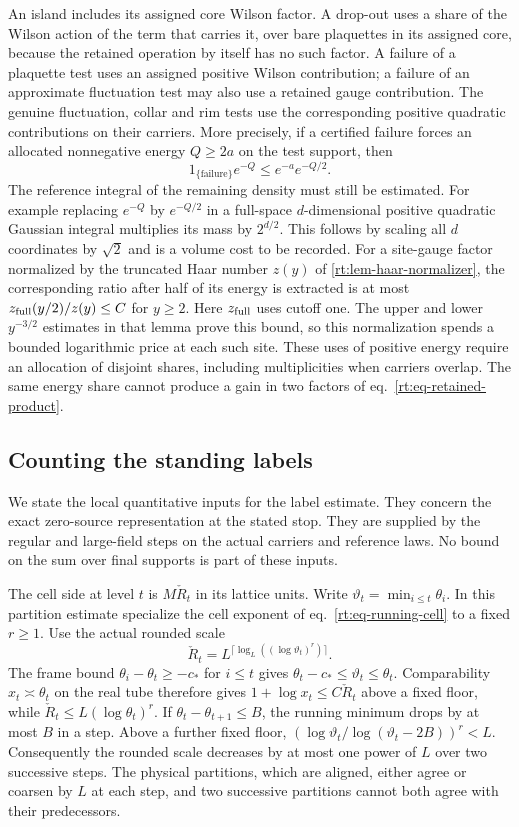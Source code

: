 \documentclass[11pt,letterpaper,reqno]{amsart}
\numberwithin{equation}{section}
\renewcommand{\eqref}[1]{\textup{eq.~\ref{#1}}}
\theoremstyle{definition}
\theoremstyle{remark}
\begin{document}
An island includes its assigned core Wilson factor. A drop-out
uses a share of the Wilson action of the term that carries it,
over bare plaquettes in its assigned core, because the retained
operation by itself has no such factor. A failure of a plaquette
test uses an assigned positive Wilson contribution; a failure of
an approximate fluctuation test may also use a retained gauge
contribution. The genuine fluctuation, collar and rim tests use
the corresponding positive quadratic contributions on their
carriers. More precisely, if a certified failure forces an
allocated nonnegative energy \(Q\ge 2a\) on the test support,
then
\[
     1_{\{\mathrm{failure}\}}e^{-Q}\le e^{-a}e^{-Q/2}.
\]
The reference integral of the remaining density must still be
estimated. For example replacing \(e^{-Q}\) by \(e^{-Q/2}\) in
a full-space \(d\)-dimensional positive quadratic Gaussian integral multiplies
its mass by \(2^{d/2}\). This follows by scaling all \(d\)
coordinates by \(\sqrt2\) and is a volume cost to be recorded.
For a site-gauge factor normalized by the truncated Haar number
$z(y)$ of \cref{rt:lem-haar-normalizer}, the corresponding ratio
after half of its energy is extracted is at most
$z_{\rm full}(y/2)/z(y)\le C$ for $y\ge2$. Here $z_{\rm full}$
uses cutoff one. The upper and lower $y^{-3/2}$ estimates in that
lemma prove this bound, so this normalization spends a bounded
logarithmic price at each such site.
These uses of positive energy require an allocation of disjoint
shares, including multiplicities when carriers overlap. The same
energy share cannot produce a gain in two factors of
\eqref{rt:eq-retained-product}.

\subsection{Counting the standing labels}
\label{rt:subsec-history-inputs}

We state the local quantitative inputs for the label estimate.
They concern the exact zero-source representation at the stated
stop. They are supplied by the regular and large-field steps on
the actual carriers and reference laws. No bound on the sum over
final supports is part of these inputs.

The cell side at level \(t\) is \(M\check R_t\) in its
lattice units. Write \(\vartheta_t=\min_{i\le t}\theta_i\).
In this partition estimate specialize the cell exponent of
\eqref{rt:eq-running-cell} to a fixed \(r\ge1\). Use the actual rounded scale
\[
      \check R_t=L^{\lceil \log_L((\log\vartheta_t)^r)\rceil}.
\]
The frame bound \(\theta_i-\theta_t\ge-c_*\) for \(i\le t\)
gives \(\theta_t-c_*\le\vartheta_t\le\theta_t\).
Comparability \(x_t\asymp\theta_t\) on the real tube
therefore gives \(1+\log x_t\le C\check R_t\) above a fixed
floor, while \(\check R_t\le L(\log\theta_t)^r\).
If \(\theta_t-\theta_{t+1}\le B\), the running minimum
drops by at most \(B\) in a step. Above a further fixed floor,
\((\log\vartheta_t/\log(\vartheta_t-2B))^r<L\).
Consequently the rounded scale decreases by at most one
power of \(L\) over two successive steps. The physical
partitions, which are aligned, either agree or coarsen by
\(L\) at each step, and two successive partitions cannot
both agree with their predecessors.
\end{document}
